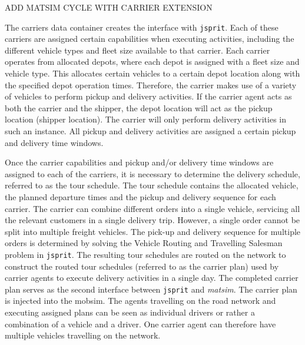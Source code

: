 ADD MATSIM CYCLE WITH CARRIER EXTENSION


The carriers data container creates the interface with \texttt{jsprit}. Each of these carriers are assigned certain capabilities when executing activities, including the different vehicle types and fleet size available to that carrier. Each carrier operates from allocated depots, where each depot is assigned with a fleet size and vehicle type. This allocates certain vehicles to a certain depot location along with the specified depot operation times. Therefore, the carrier makes use of a variety of vehicles to perform pickup and delivery activities. If the carrier agent acts as both the carrier and the shipper, the depot location will act as the pickup location (shipper location). The carrier will only perform delivery activities in such an instance. All pickup and delivery activities are assigned a certain pickup and delivery time windows.\par
Once the carrier capabilities and pickup and/or delivery time windows are assigned to each of the carriers, it is necessary to determine the delivery schedule, referred to as the tour schedule. The tour schedule contains the allocated vehicle, the planned departure times and the pickup and delivery sequence for each carrier. The carrier can combine different orders into a single vehicle, servicing all the relevant customers in a single delivery trip. However, a single order cannot be split into multiple freight vehicles. The pick-up and delivery sequence for multiple orders is determined by solving the Vehicle Routing and Travelling Salesman problem in \texttt{jsprit}. The resulting tour schedules are routed on the network to construct the routed tour schedules (referred to as the carrier plan) used by carrier agents to execute delivery activities in a single day. The completed carrier plan serves as the second interface between \texttt{jsprit} and \textit{matsim}. The carrier plan is injected into the mobsim. The agents travelling on the road network and executing assigned plans can be seen as individual drivers or rather a combination of a vehicle and a driver. One carrier agent can therefore have multiple vehicles travelling on the network.\par

